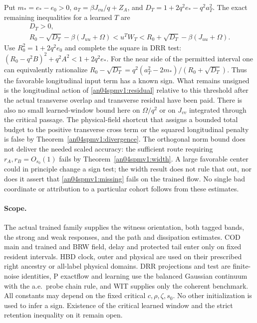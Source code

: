 \documentclass[11pt]{article}
\begin{document}
Put $m_*=e_*-e_0>0$, $a_T=\beta J_{vu}/q+Z_A$, and
$D_T=1+2q^2 e_*-q^2 a_T^2$. The exact remaining inequalities
for a learned $T$ are
\begin{equation}\label{an04spmv1:missing}
 \begin{gathered}
 D_T>0,\\
 R_0-\sqrt{D_T}-\beta(J_{uu}+\Omega)
  < u^T W_T <
 R_0+\sqrt{D_T}-\beta(J_{uu}+\Omega).
 \end{gathered}
\end{equation}
Use $R_0^2=1+2q^2e_0$ and complete the square in DRR test:
$(R_0-q^2B)^2+q^2A^2<1+2q^2 e_*$. For the near side of the
permitted interval one can equivalently rationalize
$R_0-\sqrt{D_T}=q^2(a_T^2-2m_*)/(R_0+\sqrt{D_T})$.
Thus the favorable longitudinal input term has a known sign.
What remains unsigned is the longitudinal action of
\eqref{an04spmv1:residual} relative to this threshold after the
actual transverse overlap and transverse residual have been paid.
There is also no small learned-window bound here on $\Omega/q^2$
or on $J_{vv}$ integrated through the critical passage.
The physical-field shortcut that assigns a bounded total budget to
the positive transverse cross term or the squared longitudinal penalty
is false by Theorem~\ref{an04spmv1:divergence}. The orthogonal norm
bound does not deliver the needed scaled accuracy: the sufficient route requiring $r_A,r_B=O_{s_0}(1)$
fails by Theorem~\ref{an04spmv1:width}. A large favorable center
could in principle change a sign test; the width result does not
rule that out, nor does it assert that \eqref{an04spmv1:missing}
fails on the trained flow. No single bad coordinate or attribution
to a particular cohort follows from these estimates.

\paragraph{Scope.}
The actual trained family supplies the witness orientation, both
tagged bands, the strong and weak responses, and the path and
dissipation estimates. COD main and trained and BRW field, delay
and protected tail enter only on fixed resident intervals.
HBD clock, outer and physical are used on their prescribed right
ancestry or all-label physical domains. DRR projections and test
are finite-noise identities, P exactflow and learning use the
balanced Gaussian continuum with the a.e.\ probe chain rule, and
WIT supplies only the coherent benchmark. All constants may depend
on the fixed critical $c,\rho,\zeta,s_0$. No other initialization is
used to infer a sign. Existence of the critical learned window and
the strict retention inequality on it remain open.
\end{document}
